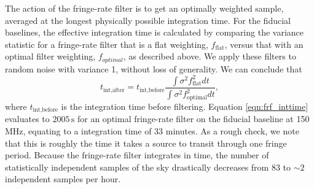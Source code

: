 \documentclass[twocolumn,numberedappendix]{emulateapj} \shorttitle{New Limits on the 21 cm Power Spectrum at $z=8.4$}
\begin{document}
The action of the fringe-rate filter is to get an optimally weighted
sample, averaged at the longest physically possible integration time.  For the
fiducial baselines, the effective integration time is calculated by comparing
the variance statistic for a fringe-rate filter that is a flat  weighting,
$f_{\text{flat}}$, versus that with an optimal filter weighting, $f_{optimal}$,
as described above. We apply these filters to random noise with variance 1,
without loss of generality. We can conclude that 
\begin{equation}\label{eqn:frf_inttime}
    t_{\text{int,after}} = t_{\text{int,before}}\frac{\int{\sigma^{2}f_{\text{flat}}^{2}dt}}{\int{\sigma^{2}f_{\text{optimal}}^{2}dt}},
\end{equation}
where $t_{\text{int,before}}$ is the integration time before filtering.
Equation \eqref{eqn:frf_inttime} evaluates to $2005\, \textrm{s}$ for an
optimal fringe-rate filter on the fiducial baseline at 150 MHz, equating to a
integration time of 33 minutes. As a rough check, we note that this is roughly
the time it takes a source to transit through one fringe period.  Because the
fringe-rate filter integrates in time, the number of statistically independent
samples of the sky drastically decreases from 83 to $\sim2$ independent samples
per hour.

%

\end{document}
